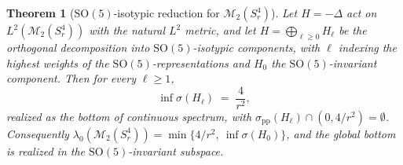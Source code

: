 \documentclass[11pt,letterpaper]{article}
\newtheorem{theorem}{Theorem}[section]
\theoremstyle{definition}
\newcommand{\cM}{\mathcal{M}}
\newcommand{\Lap}{\Delta}
\begin{document}
\begin{theorem}[$\mathrm{SO}(5)$-isotypic reduction for $\cM_2(S^4_r)$]\label{thm:SO5-isotypic}
Let $H = -\Lap$ act on $L^2(\cM_2(S^4_r))$ with the natural $L^2$ metric, and let $H = \bigoplus_{\ell\ge 0} H_\ell$ be the orthogonal decomposition into $\mathrm{SO}(5)$-isotypic components, with $\ell$ indexing the highest weights of the $\mathrm{SO}(5)$-representations and $H_0$ the $\mathrm{SO}(5)$-invariant component. Then for every $\ell \ge 1$,
\[
\inf\sigma(H_\ell) \;=\; \frac{4}{r^2},
\]
realized as the bottom of continuous spectrum, with $\sigma_{\mathrm{pp}}(H_\ell)\cap (0, 4/r^2) = \emptyset$. Consequently $\lambda_0(\cM_2(S^4_r)) = \min\{4/r^2,\ \inf\sigma(H_0)\}$, and the global bottom is realized in the $\mathrm{SO}(5)$-invariant subspace.
\end{theorem}
\end{document}
